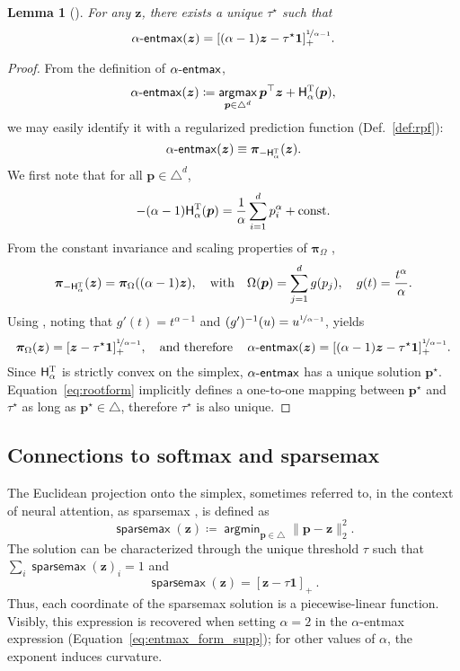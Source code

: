 \documentclass[11pt,a4paper]{article}
\newtheorem{lemma}{Lemma}
\newcommand{\amap}{\bm{\pi}}
\newcommand{\simplex}{\triangle}
\newcommand\pp{p}
\newcommand\p{\bm{\pp}}
\newcommand\xx{z}
\newcommand\x{\bm{\xx}}
\newcommand{\eqnref}[1]{Equation~\ref{eq:#1}}
\newcommand{\HHt}{\mathsf{H}^{\textsc{T}}}
\newcommand{\ones}{\bm{1}}
\newcommand\thresh{\tau}
\DeclareMathOperator*{\argmax}{\mathsf{argmax}}
\DeclareMathOperator*{\argmin}{\mathsf{argmin}}
\DeclareMathOperator*{\sparsemax}{\mathsf{sparsemax}}
\newcommand*\entmaxtext{entmax\xspace}
\newcommand*\aentmax[1][\alpha]{\mathop{\mathsf{#1}\textnormal{-}\mathsf{\entmaxtext}}}
\begin{document}
\begin{lemma}[\citealt{entmax}]
\label{lemma:tsallis_reduction}For any $\x$, there exists a unique $\tau^\star$ such that
\begin{equation}\label{eq:entmax_form_supp}
\aentmax(\x)
= [(\alpha - 1){\x} - \tau^\star \ones]_+^{\nicefrac{1}{\alpha-1}}.
\end{equation}
\end{lemma}
\begin{proof}
From the definition of $\aentmax$,
\begin{equation}
    \aentmax(\bm{z}) \coloneqq
    \argmax_{\p \in \simplex^d} \bm{p}^\top\bm{z} + \HHt_{\alpha}(\bm{p}),
\end{equation}
we may easily identify it with a regularized prediction function
(Def.~\ref{def:rpf}):
\[\aentmax(\x) \equiv \amap_{-\HHt_{\alpha}}(\x).\]
We first note that for all $\p \in \triangle^d$,
\begin{equation}
-(\alpha-1) \HHt_\alpha(\p) = \frac{1}{\alpha} \sum_{i=1}^d p_i^\alpha + \text{const}.
\end{equation}
From the constant invariance and
scaling properties of $\amap_{\Omega}$
\citep[Proposition~1, items~4--5]{blondel2019learning},
\[\amap_{-\HHt_\alpha}(\x)
= \amap_{\Omega}((\alpha - 1)\x),
\quad\text{with}\quad
\Omega(\p) =
\sum_{j=1}^{d} g(\pp_j),
\quad
g(t) = \frac{t^\alpha}{\alpha}.
\]
Using \citep[Proposition~5]{blondel2019learning}, noting that
$g'(t) = t^{\alpha - 1}$ and $(g')^{-1}(u) =  u^{\nicefrac{1}{\alpha-1}}$,
yields
\begin{equation}\label{eq:rootform}
\amap_{\Omega}(\x) = [\x - \tau^\star \ones]_+^{\nicefrac{1}{\alpha-1}},
\quad\text{and therefore}\quad
\aentmax(\x) = [(\alpha-1)\x - \tau^\star \ones]_+^{\nicefrac{1}{\alpha-1}}.
\end{equation}
Since $\HHt_\alpha$ is strictly convex on the simplex, $\aentmax$ has a unique
solution $\p^\star$. \eqnref{rootform}
implicitly defines a one-to-one mapping between $\p^\star$ and $\tau^\star$
as long as $\p^\star \in \simplex$,
therefore $\tau^\star$ is also unique.
\end{proof}

\subsection{Connections to softmax and sparsemax}\label{sec:softmax}
The Euclidean projection onto the simplex, sometimes referred to, in the context of
neural attention, as sparsemax \citep{sparsemax},
is defined as
\begin{equation}
\sparsemax(\x) \coloneqq \argmin_{\p \in \simplex} \| \p - \x \|_2^2.
\end{equation}
The solution can be characterized through the
unique threshold $\thresh$ such that $\sum_i
\sparsemax(\x)_i = 1$ and \citep{Held1974}
\begin{equation}
\sparsemax(\x) = [\x - \tau \bm{1}]_+~.
\end{equation}
Thus, each coordinate of the sparsemax solution is a piecewise-linear function.
Visibly, this expression is recovered when setting $\alpha=2$ in the
$\alpha$-\entmaxtext expression (\eqnref{entmax_form_supp}); for other
values of $\alpha$, the exponent induces curvature.
\end{document}
